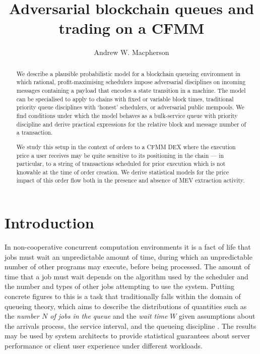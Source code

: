 \documentclass[a4paper,11pt]{article}
\title{Adversarial blockchain queues and trading on a CFMM}
\author{Andrew W. Macpherson}
\begin{document}
\maketitle

\begin{abstract}
We describe a plausible probabilistic model for a blockchain queueing environment in which rational, profit-maximising schedulers impose adversarial disciplines on incoming messages containing a payload that encodes a state transition in a machine.
%
The model can be specialised to apply to chains with fixed or variable block times, traditional priority queue disciplines with `honest' schedulers, or adversarial public mempools.
%
We find conditions under which the model behaves as a bulk-service queue with priority discipline and derive practical expressions for the relative block and message number of a transaction.

We study this setup in the context of orders to a CFMM DEX where the execution price a user receives may be quite sensitive to its positioning in the chain --- in particular, to a string of transactions scheduled for prior execution which is not knowable at the time of order creation.
%
We derive statistical models for the price impact of this order flow both in the presence and absence of MEV extraction activity.

\end{abstract}

\section{Introduction}

In non-cooperative concurrent computation environments it is a fact of life that jobs must wait an unpredictable amount of time, during which an unpredictable number of other programs may execute, before being processed.
%
The amount of time that a job must wait depends on the algorithm used by the scheduler and the number and types of other jobs attempting to use the system.
%
Putting concrete figures to this is a task that traditionally falls within the domain of queueing theory, which aims to describe the distributions of quantities such as the \emph{number $N$ of jobs in the queue} and the \emph{wait time} $W$ given assumptions about the arrivals process, the service interval, and the queueing discipline \cite{erlang1909theory,gross2018fundamentals}.
%
The results may be used by system architects to provide statistical guarantees about server performance or client user experience under different workloads.
\end{document}
